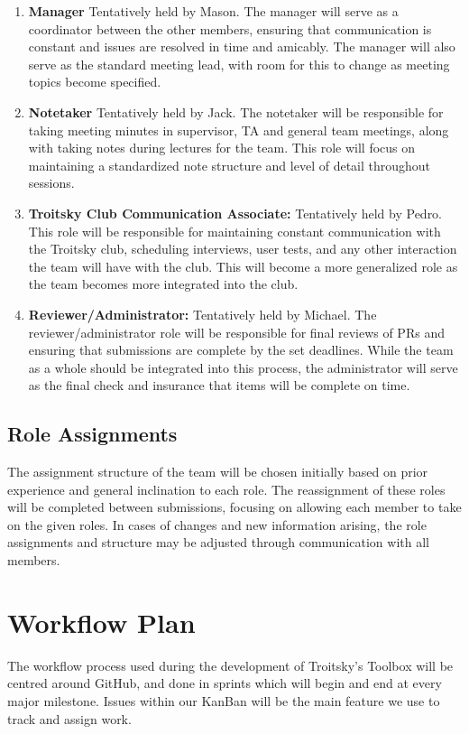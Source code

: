 \documentclass{article}
\begin{document}
\begin{enumerate}
  \item \textbf{Manager} Tentatively held by Mason. The manager will serve as a coordinator between the other members, ensuring that communication is 
  constant and issues are resolved in time and amicably. The manager will also serve as the standard meeting lead, with room 
  for this to change as meeting topics become specified.

  \item \textbf{Notetaker} Tentatively held by Jack. The notetaker will be responsible for taking meeting minutes in supervisor, TA and general team meetings, along with 
  taking notes during lectures for the team. This role will focus on maintaining a standardized note structure and level of detail throughout sessions.

  \item \textbf{Troitsky Club Communication Associate:} Tentatively held by Pedro. This role will be responsible for maintaining constant communication with the Troitsky club, scheduling 
  interviews, user tests, and any other interaction the team will have with the club. This will become a more generalized role as the team becomes more integrated 
  into the club.

  \item \textbf{Reviewer/Administrator:} Tentatively held by Michael. The reviewer/administrator role will be responsible for final reviews of PRs and ensuring that submissions are complete 
  by the set deadlines. While the team as a whole should be integrated into this process, the administrator will serve as the final check and insurance that 
  items will be complete on time.
\end{enumerate}

\subsection{Role Assignments}

The assignment structure of the team will be chosen initially based on prior experience and general inclination to each role. The reassignment of these roles will be 
completed between submissions, focusing on allowing each member to take on the given roles. In cases of changes and new information arising, the role assignments and structure 
may be adjusted through communication with all members.

\section{Workflow Plan}
The workflow process used during the development of Troitsky's Toolbox will be centred around GitHub, and done in sprints which will begin and end at every major milestone. Issues within our KanBan will be the main feature we use to track and assign work.
\end{document}
